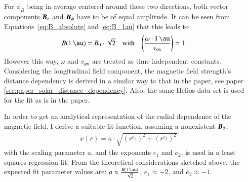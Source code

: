 For $\phi_B$ being in average centered around these two directions, both vector components $\boldsymbol{B}_r$ and $\boldsymbol{B}_\phi$ have to be of equal amplitude. It can be seen from Equations~\ref{eq:B_absolute} and \ref{eq:B_1au} that this leads to
\begin{align}
	B(\SI{1}{\au}) &= B_0 \cdot \sqrt{2}	&\text{with}	&	&	\left(\frac{\omega\cdot\SI{1}{\au}}{v_\text{sw}}\right) &= 1\,.
\end{align}
However this way, $\omega$ and $v_\text{sw}$ are treated as time independent constants.\\

Considering the longitudinal field component, the magnetic field strength's distance dependency is derived in a similar way to that in the paper, see paper \autoref{sec:paper_solar_distance_dependency}. Also, the same Helios data set is used for the fit as is in the paper.

In order to get an analytical representation of the radial dependence of the magnetic field, I derive a suitable fit function, assuming a nonexistent $\boldsymbol{B}_\theta$,
\begin{align}
	x(r) = a \cdot \sqrt{\left(r^{e_1}\right)^2 + \left(r^{e_2}\right)^2}	\label{eq:sqare_power_law}
\end{align}
with the scaling parameter $a$, and the exponents $e_1$ and $e_2$, is used in a least squares regression fit. From the theoretical considerations sketched above, the expected fit parameter values are: $a \approx \frac{B(\SI{1}{\au})}{\sqrt{2}}$, $e_1 \approx -2$, and $e_2 \approx -1$.

